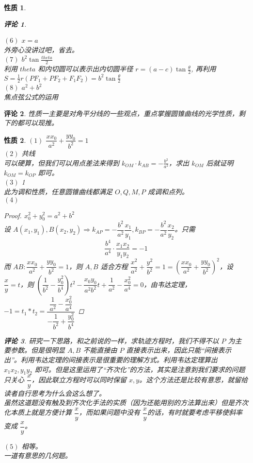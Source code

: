 \documentclass[a4paper,10pt,twoside]{article}
\newtheorem{remark}{评论}
\newtheorem{proposition}{性质}
\begin{document}
\begin{proposition}
\begin{remark}
      \end{remark}
       $ (6) $  $ x=a $\\外旁心没讲过吧，省去。\\
        $ (7) $  $ b^2\tan \frac{theta}{2} $ \\利用 $ theta  $ 和内切圆可以表示出内切圆半径 $ r=(a-c)\tan\frac{\theta }{2} $,  再利用  $ S=\frac{1}{2}r(PF_1+PF_2+F_1F_2)=b^2\tan\frac{\theta}{2} $\\
         $ (8) $  $ a^2+b^2 $ \\焦点弦公式的运用\\
\end{proposition}
\begin{remark}
    性质一主要是对角平分线的一些观点，重点掌握圆锥曲线的光学性质，剩下的都可以现推。
\end{remark}
\begin{proposition}
     $ (1) $  $ \dfrac{xx_0}{a^2}+\dfrac{yy_0}{b^2}=1 $\\
      $ (2) $ 共线\\可以硬算，但我们可以用点差法来得到 $ k_{OM}\cdot k_{AB}=-\frac{b^2}{a^2} $，求出 $ k_{OM } $ 后就证明 $ k_{OM}=k_{OP} $ 即可。\\

       $ (3) $ 1\\此为调和性质，任意圆锥曲线都满足 $ O,Q,M,P  $ 成调和点列。\\
        $ (4) $  
        \begin{proof}
            $ x_0^2+y_0^2=a^2+b^2 $ \\设 $ A(x_1,y_1),B(x_2,y_2)\Rightarrow k_{AP}=-\dfrac{b^2}{a^2}\dfrac{x_1}{y_1},k_{BP}=-\dfrac{b^2}{a^2}\dfrac{x_2}{y_2} $。只需
        \begin{equation}
            \dfrac{b^4}{a^4}\cdot \dfrac{x_1x_2}{y_1y_2}=-1
        \end{equation} 
        而 $ AB:\dfrac{xx_0}{a^2}+\dfrac{yy_0}{b^2}=1 $，则 $ A,B  $ 适合方程 $ \dfrac{x^2}{a^2}+\dfrac{y^2}{b^2}=1=(\dfrac{xx_0}{a^2}+\dfrac{yy_0}{b^2})^2 $，设 $ \dfrac{x }{y }=t $，则 $ (\dfrac{1}{b^2}-\dfrac{y_0^2}{b^4})t^2-\dfrac{x_0y_0}{a^2b^2}t+\dfrac{1}{a^2 }-\dfrac{x_0^2}{a^4}=0 $，由韦达定理， $ -1=t_1*t_2=\dfrac{\dfrac{1}{a^2 }-\dfrac{x_0^2}{a^4}}{-\dfrac{1}{b^2}+\dfrac{y_0^2}{b^4}} $ 
        \end{proof} 
        \begin{remark}
            研究一下思路，和之前说的一样，求轨迹方程时，我们不得不以 $ P  $ 为主要参数。但是很明显 $ A,B  $ 不能直接由 $ P  $ 直接表示出来，因此只能“间接表示出”。利用韦达定理的间接表示是很重要的理解方式。利用韦达定理算出 $ x_1x_2,y_1y_2 $ 即可。但是这里运用了“齐次化”的方法，其实是注意到我们要求的问题只关心 $ \dfrac{x }{y} $，因此联立方程时可以同时保留 $ x,y  $。这个方法还是比较有意思，就留给读者自行思考为什么会这么想了。  \\
            虽然这道题没有触及到齐次化手法的实质（因为还能用别的方法算出来）但是齐次化本质上就是方便计算 $ \dfrac{x }{y } $，而如果问题中没有 $ \dfrac{x }{y } $的话，有时就要考虑平移使斜率变成 $ \dfrac{x}{y} $。 
        \end{remark}
     $ (5) $ 相等。\\一道有意思的几何题。 
\end{proposition}
\end{document}
